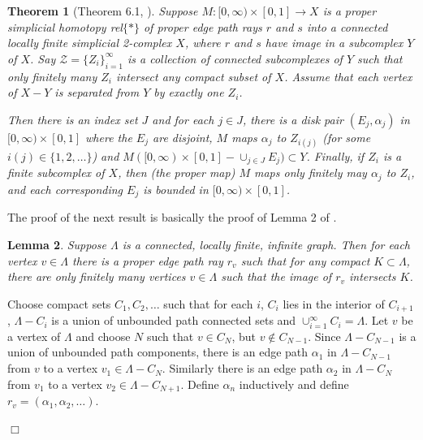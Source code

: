 \documentclass[12pt]{article}
\newtheorem{theorem}{Theorem}[subsection]
\newtheorem{lemma}[theorem]{Lemma}
\newenvironment{proof}{\addvspace{12pt}\noindent{\bf Proof:}}{
$\Box$\par\addvspace{12pt}}
\begin{document}
\begin{theorem} [Theorem 6.1, \cite{MMGP}] \label{excise} 
Suppose $M:[0,\infty)\times [0,1]\to  X$ is a proper simplicial homotopy rel$\{\ast\}$ of proper edge path rays  $r$ and $s$ into a connected locally finite simplicial 2-complex $X$, where $r$ and $s$ have image in a subcomplex $Y$ of $X$. Say $\mathcal Z=\{Z_i\}_{i=1}^\infty$ is a collection of connected subcomplexes of $Y$ such that only finitely many $Z_i$ intersect any compact subset of $X$.
Assume that each vertex of $X-Y$ is separated from $Y$ by exactly one $Z_i$. 

Then there is an index set $J$ and for each $j\in J$, there is a disk pair $(E_j,\alpha_j)$ in  $[0,\infty)\times [0,1]$ where the $E_j$ are disjoint, $M$ maps $\alpha_j$  to $Z_{i(j)}$ (for some $i(j)\in \{1,2,\ldots\}$) and $M([0,\infty)\times [0,1]-\cup_{j\in J} E_j)\subset Y$. Finally, if $Z_i$ is a finite subcomplex of $X$, then (the proper map) $M$ maps only finitely may $\alpha_j$ to $Z_i$, and each corresponding $E_j$ is bounded in $[0,\infty)\times [0,1]$.
\end{theorem} 
The proof of the next result is basically the proof of Lemma 2 of \cite{M86}.

\begin{lemma} \label{LocFin} 
Suppose $\Lambda$ is a connected, locally finite, infinite graph. Then for each vertex $v\in \Lambda$ there is a proper edge path ray $r_v$ such that for any compact $K\subset \Lambda$, there are only finitely many vertices $v\in\Lambda$ such that the image of $r_v$ intersects $K$. 
\end{lemma}
\begin{proof}
Choose compact sets $C_1,C_2,\ldots$ such that for each $i$, $C_i$ lies in the interior of $C_{i+1}$, $\Lambda-C_i$ is a union of unbounded path connected sets and $\cup_{i=1}^\infty C_i=\Lambda$. Let $v$ be a vertex of $\Lambda$ and choose $N$ such that $v\in C_{N}$, but $v\not\in C_{N-1}$. 
Since $\Lambda-C_{N-1}$ is a union of unbounded path components, there is an edge path $\alpha_1$ in $\Lambda-C_{N-1}$ from $v$ to a vertex $v_1\in \Lambda-C_N$. Similarly there is an edge path $\alpha_2$ in $\Lambda-C_N$ from $v_1$ to a vertex $v_2\in \Lambda-C_{N+1}$. Define $\alpha_n$ inductively and define $r_v=(\alpha_1,\alpha_2,\ldots)$.
\end{proof}
\end{document}
